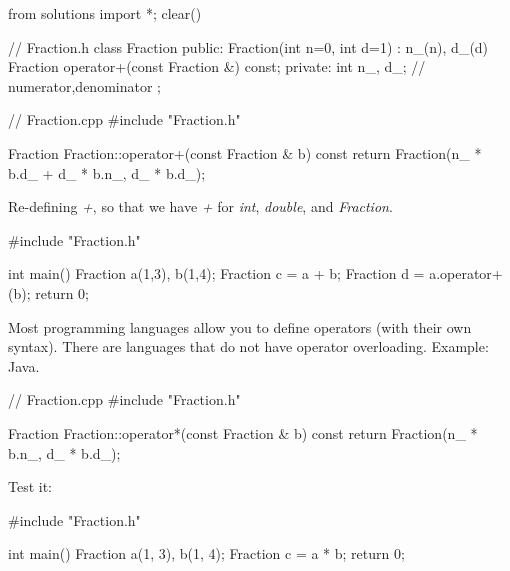 \begin{python0}
from solutions import *; clear()
\end{python0}

\begin{consolethree}[escapeinside=||]
// Fraction.h
class Fraction
{
public:
    Fraction(int n=0, int d=1)
        : n_(n), d_(d)
    {}
    Fraction operator+(const Fraction &) const;
private:
    int n_, d_; // numerator,denominator
};
\end{consolethree}

\begin{consolethree}[escapeinside=||]
// Fraction.cpp
#include "Fraction.h"

Fraction Fraction::operator+(const Fraction & b) const
{
    return Fraction(n_ * b.d_ + d_ * b.n_, d_ * b.d_);
}
\end{consolethree}

Re-defining \textit{+}, so that we have \textit{+} for \textit{int},
\textit{double}, and \textit{Fraction}.

\begin{consolethree}[escapeinside=||]
#include "Fraction.h"

int main()
{
    Fraction a(1,3), b(1,4);
    Fraction c = a + b;
    Fraction d = a.operator+(b);
    return 0;
}
\end{consolethree}

Most programming languages allow you to define operators (with their own
syntax). There are languages that do not have operator overloading.
Example: Java.

\begin{consolethree}[escapeinside=||]
// Fraction.cpp
#include "Fraction.h"

Fraction Fraction::operator*(const Fraction & b) const
{
    return Fraction(n_ * b.n_, d_ * b.d_);
}
\end{consolethree}

Test it:

\begin{consolethree}[escapeinside=||]
#include "Fraction.h"

int main()
{
    Fraction a(1, 3), b(1, 4);
    Fraction c = a * b;
    return 0;
}
\end{consolethree}


